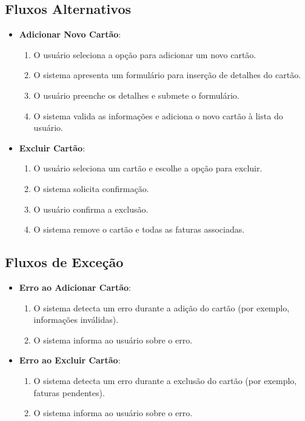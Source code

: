 \subsection*{Fluxos Alternativos}
\begin{addmargin}[1.5cm]{0cm}
	\begin{itemize}
		\item \textbf{Adicionar Novo Cartão}:
		      \begin{enumerate}
			      \item O usuário seleciona a opção para adicionar um novo cartão.
			      \item O sistema apresenta um formulário para inserção de detalhes do cartão.
			      \item O usuário preenche os detalhes e submete o formulário.
			      \item O sistema valida as informações e adiciona o novo cartão à lista do usuário.
		      \end{enumerate}

		\item \textbf{Excluir Cartão}:
		      \begin{enumerate}
			      \item O usuário seleciona um cartão e escolhe a opção para excluir.
			      \item O sistema solicita confirmação.
			      \item O usuário confirma a exclusão.
			      \item O sistema remove o cartão e todas as faturas associadas.
		      \end{enumerate}
	\end{itemize}
\end{addmargin}

\subsection*{Fluxos de Exceção}
\begin{addmargin}[1.5cm]{0cm}
	\begin{itemize}
		\item \textbf{Erro ao Adicionar Cartão}:
		      \begin{enumerate}
			      \item O sistema detecta um erro durante a adição do cartão (por exemplo, informações inválidas).
			      \item O sistema informa ao usuário sobre o erro.
		      \end{enumerate}

		\item \textbf{Erro ao Excluir Cartão}:
		      \begin{enumerate}
			      \item O sistema detecta um erro durante a exclusão do cartão (por exemplo, faturas pendentes).
			      \item O sistema informa ao usuário sobre o erro.
		      \end{enumerate}
	\end{itemize}
\end{addmargin}

